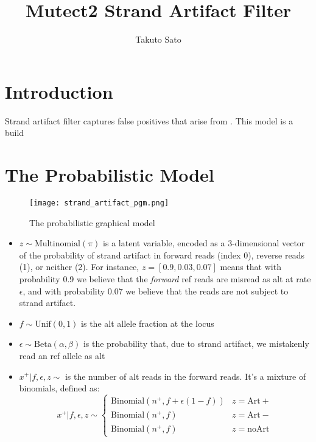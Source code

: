 \documentclass[a4paper]{article}
\title{Mutect2 Strand Artifact Filter}
\author{Takuto Sato}
\begin{document}
\maketitle

\section{Introduction}


Strand artifact filter captures false positives that arise from . This model is a build 

\section{The Probabilistic Model}
\begin{figure}
\centering
\texttt{[image: strand\_artifact\_pgm.png]}
\caption{\label{fig:frog}The probabilistic graphical model}
\end{figure}

\begin{itemize}
	\item $z \sim \text{Multinomial}(\pi)$ is a latent variable, encoded as a 3-dimensional vector of the probability of strand artifact in forward reads (index 0), reverse reads (1), or neither (2). For instance, $z = [0.9, 0.03, 0.07]$ means that with probability 0.9 we believe that the \textit{forward} ref reads are misread as alt at rate $\epsilon$, and with probability 0.07 we believe that the reads are not subject to strand artifact.
	\item $f \sim \text{Unif}(0, 1)$ is the alt allele fraction at the locus
	\item $\epsilon \sim \text{Beta}(\alpha, \beta)$ is the probability that,  due to strand artifact, we mistakenly read an ref allele as alt
	\item $x^+ | f, \epsilon, z \sim$ is the number of alt reads in the forward reads. It's a mixture of binomials, defined as:
	$$
	x^+ | f, \epsilon, z \sim
		\begin{cases}
			\text{Binomial} (n^+, f + \epsilon(1-f)) & z = \mathrm{Art+}\\
			 \text{Binomial} (n^+, f) 			& z = \mathrm{Art-} \\
			 \text{Binomial} (n^+, f)			& z = \mathrm{noArt}
		\end{cases}
	$$
\end{itemize}
\end{document}
